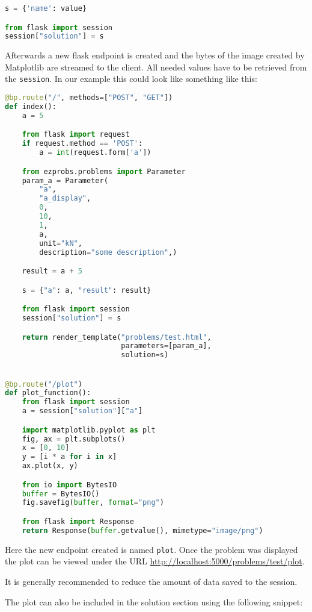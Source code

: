 \begin{lstlisting}[language=python]
s = {'name': value}

from flask import session
session["solution"] = s
\end{lstlisting}

Afterwards a new flask endpoint is created and the bytes of the image created
by Matplotlib are streamed to the client. All needed values have to be
retrieved from the \verb+session+. In our example this could look like
something like this:

\begin{lstlisting}[language=python]
@bp.route("/", methods=["POST", "GET"])
def index():
    a = 5

    from flask import request
    if request.method == 'POST':
        a = int(request.form['a'])

    from ezprobs.problems import Parameter
    param_a = Parameter(
        "a",
        "a_display",
        0,
        10,
        1,
        a,
        unit="kN",
        description="some description",)

    result = a + 5

    s = {"a": a, "result": result}

    from flask import session
    session["solution"] = s

    return render_template("problems/test.html",
                           parameters=[param_a],
                           solution=s)


@bp.route("/plot")
def plot_function():
    from flask import session
    a = session["solution"]["a"]

    import matplotlib.pyplot as plt
    fig, ax = plt.subplots()
    x = [0, 10]
    y = [i * a for i in x]
    ax.plot(x, y)

    from io import BytesIO
    buffer = BytesIO()
    fig.savefig(buffer, format="png")

    from flask import Response
    return Response(buffer.getvalue(), mimetype="image/png")
\end{lstlisting}

Here the new endpoint created is named \verb+plot+. Once the problem was
displayed the plot can be viewed under the URL
\href{http://localhost:5000/problems/test/plot}{http://localhost:5000/problems/test/plot}.

It is generally recommended to reduce the amount of data saved to the session.

The plot can also be included in the solution section using the
following snippet:

